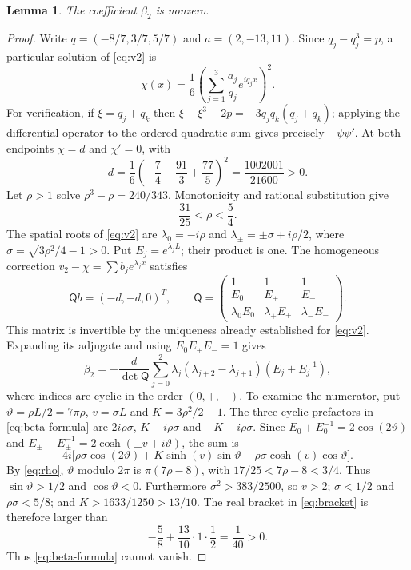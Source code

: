 \documentclass[11pt]{article}
\newtheorem{lemma}[theorem]{Lemma}
\theoremstyle{remark}\newtheorem{remark}[theorem]{Remark}
\numberwithin{equation}{section}
\begin{document}
\begin{lemma}\label{lem:beta}
The coefficient $\beta_2$ is nonzero.
\end{lemma}
\begin{proof}
Write $q=(-8/7,3/7,5/7)$ and $a=(2,-13,11)$.
Since $q_j-q_j^3=p$, a particular solution of \eqref{eq:v2} is
\[
 \chi(x)=\frac16\left(\sum_{j=1}^3\frac{a_j}{q_j}e^{iq_jx}\right)^2.
\]
For verification, if $\xi=q_j+q_k$ then
$\xi-\xi^3-2p=-3q_jq_k(q_j+q_k)$; applying the differential operator to the
ordered quadratic sum gives precisely $-\psi\psi'$.
At both endpoints $\chi=d$ and $\chi'=0$, with
\begin{equation}\label{eq:d}
 d=\frac16\left(-\frac74-\frac{91}3+\frac{77}5\right)^2
 =\frac{1002001}{21600}>0.
\end{equation}
Let $\rho>1$ solve $\rho^3-\rho=240/343$. Monotonicity and rational
substitution give
\begin{equation}\label{eq:rho}
 \frac{31}{25}<\rho<\frac54.
\end{equation}
The spatial roots of \eqref{eq:v2} are
$\lambda_0=-i\rho$ and $\lambda_\pm=\pm\sigma+i\rho/2$, where
$\sigma=\sqrt{3\rho^2/4-1}>0$. Put $E_j=e^{\lambda_jL}$; their product is one.
The homogeneous correction $v_2-\chi=\sum b_je^{\lambda_jx}$ satisfies
\[
 \mathsf Qb=(-d,-d,0)^T,\qquad
 \mathsf Q=\begin{pmatrix}
 1&1&1\\ E_0&E_+&E_-\\
 \lambda_0E_0&\lambda_+E_+&\lambda_-E_-
 \end{pmatrix}.
\]
This matrix is invertible by the uniqueness already established for
\eqref{eq:v2}. Expanding its adjugate and using $E_0E_+E_-=1$ gives
\begin{equation}\label{eq:beta-formula}
 \beta_2=-\frac d{\det\mathsf Q}
 \sum_{j=0}^2\lambda_j(\lambda_{j+2}-\lambda_{j+1})(E_j+E_j^{-1}),
\end{equation}
where indices are cyclic in the order $(0,+,-)$.
To examine the numerator, put $\vartheta=\rho L/2=7\pi\rho$,
$v=\sigma L$ and $K=3\rho^2/2-1$. The three cyclic prefactors in
\eqref{eq:beta-formula} are $2i\rho\sigma$, $K-i\rho\sigma$ and
$-K-i\rho\sigma$. Since
$E_0+E_0^{-1}=2\cos(2\vartheta)$ and
$E_\pm+E_\pm^{-1}=2\cosh(\pm v+i\vartheta)$, the sum is
\begin{equation}\label{eq:bracket}
 4i\bigl[\rho\sigma\cos(2\vartheta)
 +K\sinh(v)\sin\vartheta-\rho\sigma\cosh(v)\cos\vartheta\bigr].
\end{equation}
By \eqref{eq:rho}, $\vartheta$ modulo $2\pi$ is $\pi(7\rho-8)$, with
$17/25<7\rho-8<3/4$. Thus $\sin\vartheta>1/2$ and $\cos\vartheta<0$.
Furthermore $\sigma^2>383/2500$, so $v>2$;
$\sigma<1/2$ and $\rho\sigma<5/8$; and
$K>1633/1250>13/10$.
The real bracket in \eqref{eq:bracket} is therefore larger than
\[
 -\frac58+\frac{13}{10}\cdot1\cdot\frac12=\frac1{40}>0.
\]
Thus \eqref{eq:beta-formula} cannot vanish.
\end{proof}
\end{document}
